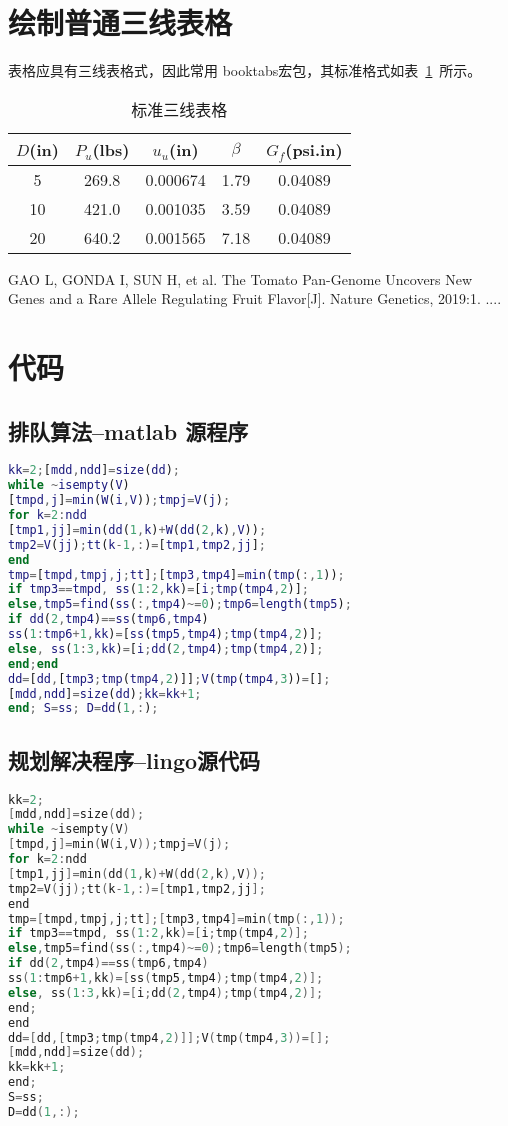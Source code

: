 \documentclass{whutmod}
\begin{document}
\begin{spacing}{1.0}
\section{绘制普通三线表格}
表格应具有三线表格式，因此常用 booktabs宏包，其标准格式如表~\ref{tab001}~所示。
\begin{table}[!htbp]
	\caption{标准三线表格}\label{tab001} \centering
	\begin{tabular}{ccccc}
		\toprule[1.5pt]
		$D$(in) & $P_u$(lbs) & $u_u$(in) & $\beta$ & $G_f$(psi.in)\\
		\midrule[1pt]
		5 & 269.8 & 0.000674 & 1.79 & 0.04089\\
		10 & 421.0 & 0.001035 & 3.59 & 0.04089\\
		20 & 640.2 & 0.001565 & 7.18 & 0.04089\\
		\bottomrule[1.5pt]
	\end{tabular}
\end{table}

\begin{thebibliography}{9}%
	 GAO L, GONDA I, SUN H, et al. The Tomato Pan-Genome Uncovers New Genes and a	Rare Allele Regulating Fruit Flavor[J]. Nature Genetics, 2019:1.
	 ....
\end{thebibliography}

\appendix %
\section{代码}
\subsection{排队算法--matlab 源程序}
\begin{lstlisting}[language=matlab]
kk=2;[mdd,ndd]=size(dd);
while ~isempty(V)
[tmpd,j]=min(W(i,V));tmpj=V(j);
for k=2:ndd
[tmp1,jj]=min(dd(1,k)+W(dd(2,k),V));
tmp2=V(jj);tt(k-1,:)=[tmp1,tmp2,jj];
end
tmp=[tmpd,tmpj,j;tt];[tmp3,tmp4]=min(tmp(:,1));
if tmp3==tmpd, ss(1:2,kk)=[i;tmp(tmp4,2)];
else,tmp5=find(ss(:,tmp4)~=0);tmp6=length(tmp5);
if dd(2,tmp4)==ss(tmp6,tmp4)
ss(1:tmp6+1,kk)=[ss(tmp5,tmp4);tmp(tmp4,2)];
else, ss(1:3,kk)=[i;dd(2,tmp4);tmp(tmp4,2)];
end;end
dd=[dd,[tmp3;tmp(tmp4,2)]];V(tmp(tmp4,3))=[];
[mdd,ndd]=size(dd);kk=kk+1;
end; S=ss; D=dd(1,:);
\end{lstlisting}
\subsection{规划解决程序--lingo源代码}
\begin{lstlisting}[language=c]
kk=2;
[mdd,ndd]=size(dd);
while ~isempty(V)
[tmpd,j]=min(W(i,V));tmpj=V(j);
for k=2:ndd
[tmp1,jj]=min(dd(1,k)+W(dd(2,k),V));
tmp2=V(jj);tt(k-1,:)=[tmp1,tmp2,jj];
end
tmp=[tmpd,tmpj,j;tt];[tmp3,tmp4]=min(tmp(:,1));
if tmp3==tmpd, ss(1:2,kk)=[i;tmp(tmp4,2)];
else,tmp5=find(ss(:,tmp4)~=0);tmp6=length(tmp5);
if dd(2,tmp4)==ss(tmp6,tmp4)
ss(1:tmp6+1,kk)=[ss(tmp5,tmp4);tmp(tmp4,2)];
else, ss(1:3,kk)=[i;dd(2,tmp4);tmp(tmp4,2)];
end;
end
dd=[dd,[tmp3;tmp(tmp4,2)]];V(tmp(tmp4,3))=[];
[mdd,ndd]=size(dd);
kk=kk+1;
end;
S=ss;
D=dd(1,:);
\end{lstlisting}
\end{spacing}
\end{document}
